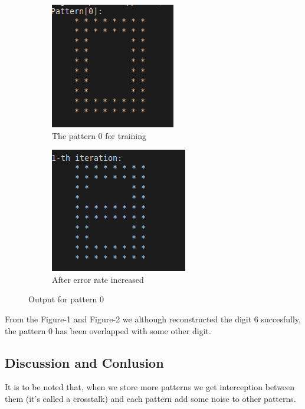 \documentclass{article}
\begin{document}
\begin{figure}
\centering
\begin{subfigure}{.5\textwidth}
  \centering
  \includegraphics[width=.4\linewidth]{zerot.png}
  \caption{The pattern 0 for training}
  \label{fig:zerot}
\end{subfigure}%
\begin{subfigure}{.5\textwidth}
  \centering
  \includegraphics[width=.4\linewidth]{zero3.png}
  \caption{After error rate increased}
  \label{fig:zero3}
\end{subfigure}
\caption{Output for pattern 0}
\label{fig:two}
\end{figure}


From the Figure-1 and Figure-2 we although reconstructed the digit 6 succesfully, the
pattern 0 has been overlapped with some other digit. 

\subsection{Discussion and Conlusion}
It is to be noted that, when we store more patterns we get interception between 
them (it’s called a crosstalk) and each pattern add some noise to other patterns.
\end{document}
